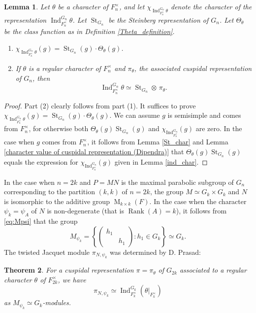 \documentclass[reqno]{amsart}
\newtheorem{theorem}{Theorem}[section]
\newtheorem{lemma}[theorem]{Lemma}
\theoremstyle{definition}
\theoremstyle{remark}
\numberwithin{equation}{section}
\DeclareMathOperator{\Ind}{Ind}
\DeclareMathOperator{\M}{M}
\DeclareMathOperator{\Rank}{Rank}
\DeclareMathOperator{\St}{St}
\newcommand{\bbsm}{\left (\begin{smallmatrix}}      \newcommand{\besm}{\end{smallmatrix}\right )}
\begin{document}
\begin{lemma} \label{ind=st_times_cuspidal} 
Let $\theta$ be a character of $F_n^\times$, and let $\chi_{\Ind_{F_n^\times}^{G_n} \theta}$ denote the character of the  representation $\Ind_{F_n^\times}^{G_n} \theta$. Let  $\St_{G_n}$ be the Steinberg representation   of $G_n$. Let $\Theta_\theta$ be the class function as in Definition \ref{Theta_definition}. \begin{enumerate}
\item[\emph{(1)}] $\chi_{\Ind_{F_n^\times}^{G_n} \theta}(g) = \St_{G_n}(g) \cdot \Theta_\theta(g)$.
\item[\emph{(2)}]  If $\theta$ is a regular character of $F_n^\times$ and $\pi_\theta$, the associated cuspidal representation of $G_n$, then
\[ \Ind_{F_n^\times}^{G_n} \theta  \simeq \St_{G_n} \otimes\,  \pi_\theta.\]
\end{enumerate}
\end{lemma}
\begin{proof}
Part (2) clearly follows from part (1). It suffices to prove $\chi_{\Ind_{F_n^\times}^{G_n} \theta}(g)=\St_{G_n}(g) \cdot \Theta_\theta(g)$. We can assume $g$ is semisimple and comes from $F_n^\times$, for otherwise both  $\Theta_{\theta}(g) \St_{G_n}(g)$ and $\chi_{\Ind_{F_n^\times}^{G_n}}(g)$ are  zero.
In the case when  $g$ comes from $F_n^\times$, it follows from Lemma \ref{St_char} and Lemma \ref{character value of cuspidal representation (Dipendra)} that  $\Theta_\theta(g) \St_{G_n}(g)$  equals the expression for $\chi_{\Ind_{F_n^\times}^{G_n}}(g)$ given in Lemma \ref{ind_char}.
 \end{proof}


In the case when $n=2k$ and $P=MN$ is the maximal parabolic subgroup of $G_n$ corresponding to the partition $(k,k)$ of $n=2k$, the group $M \simeq G_k \times G_k$ and $N$ is isomorphic to the additive group $\M_{k\times k}(F)$. In the case when the character $\psi_k=\psi_A$ of $N$ is non-degenerate (that is  $\Rank(A)=k$), it follows from \eqref{eq:Mpsi} that  the group \[ M_{\psi_k}=\left\{ \bbsm h_1 & \\ & h_1 \besm \colon h_1 \in G_k\right\} \simeq G_k.\]
The  twisted Jacquet module $\pi_{N, \psi_k}$ was determined by  D. Prasad:
\begin{theorem} \cite{Dip[1]}  \label{n=2k_nondeg} For  a cuspidal representation $\pi=\pi_\theta$ of $G_{2k}$ associated to a regular character $\theta$  of $F_{2k}^\times$, we have  
\[ \pi_{N,\psi_k} \simeq \Ind_{F_k^\times}^{G_k} (\theta |_{F_k^\times})\]
as $M_{\psi_k}\simeq G_k$-modules.
\end{theorem}
\end{document}
